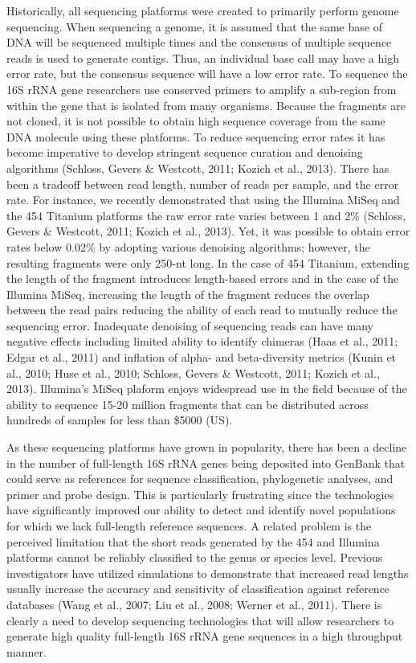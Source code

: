 \documentclass[11pt,]{article}
\begin{document}
Historically, all sequencing platforms were created to primarily perform
genome sequencing. When sequencing a genome, it is assumed that the same
base of DNA will be sequenced multiple times and the consensus of
multiple sequence reads is used to generate contigs. Thus, an individual
base call may have a high error rate, but the consensus sequence will
have a low error rate. To sequence the 16S rRNA gene researchers use
conserved primers to amplify a sub-region from within the gene that is
isolated from many organisms. Because the fragments are not cloned, it
is not possible to obtain high sequence coverage from the same DNA
molecule using these platforms. To reduce sequencing error rates it has
become imperative to develop stringent sequence curation and denoising
algorithms (Schloss, Gevers \& Westcott, 2011; Kozich et al., 2013).
There has been a tradeoff between read length, number of reads per
sample, and the error rate. For instance, we recently demonstrated that
using the Illumina MiSeq and the 454 Titanium platforms the raw error
rate varies between 1 and 2\% (Schloss, Gevers \& Westcott, 2011; Kozich
et al., 2013). Yet, it was possible to obtain error rates below 0.02\%
by adopting various denoising algorithms; however, the resulting
fragments were only 250-nt long. In the case of 454 Titanium, extending
the length of the fragment introduces length-based errors and in the
case of the Illumina MiSeq, increasing the length of the fragment
reduces the overlap between the read pairs reducing the ability of each
read to mutually reduce the sequencing error. Inadequate denoising of
sequencing reads can have many negative effects including limited
ability to identify chimeras (Haas et al., 2011; Edgar et al., 2011) and
inflation of alpha- and beta-diversity metrics (Kunin et al., 2010; Huse
et al., 2010; Schloss, Gevers \& Westcott, 2011; Kozich et al., 2013).
Illumina's MiSeq plaform enjoys widespread use in the field because of
the ability to sequence 15-20 million fragments that can be distributed
across hundreds of samples for less than \$5000 (US).

As these sequencing platforms have grown in popularity, there has been a
decline in the number of full-length 16S rRNA genes being deposited into
GenBank that could serve as references for sequence classification,
phylogenetic analyses, and primer and probe design. This is particularly
frustrating since the technologies have significantly improved our
ability to detect and identify novel populations for which we lack
full-length reference sequences. A related problem is the perceived
limitation that the short reads generated by the 454 and Illumina
platforms cannot be reliably classified to the genus or species level.
Previous investigators have utilized simulations to demonstrate that
increased read lengths usually increase the accuracy and sensitivity of
classification against reference databases (Wang et al., 2007; Liu et
al., 2008; Werner et al., 2011). There is clearly a need to develop
sequencing technologies that will allow researchers to generate high
quality full-length 16S rRNA gene sequences in a high throughput manner.
\end{document}

